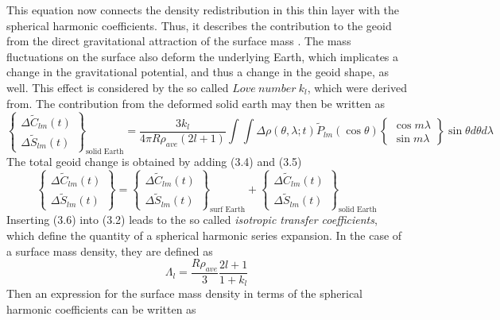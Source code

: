 This equation now connects the density redistribution in this thin layer with the spherical harmonic coefficients. Thus, it describes the contribution to the geoid from the direct gravitational attraction of the surface mass \cite{wahr1998time}. The mass fluctuations on the surface also deform the underlying Earth, which implicates a change in the gravitational potential, and thus a change in the geoid shape, as well. This effect is considered by the so called $Love\ number\ k_{l}$, which were derived from\cite{han1995viscoelastic}. The contribution from the deformed solid earth may then be written as
\begin{equation}
\begin{Bmatrix}
\Delta \tilde{C}_{lm}(t)\\
\Delta \tilde{S}_{lm}(t)
\end{Bmatrix}_{\text{solid Earth}} = \frac{3k_{l}}{4\pi R \rho_{ave}(2l+1)} \int \int \Delta \rho(\theta,\lambda;t) \tilde{P}_{lm}(\cos \theta) 
\begin{Bmatrix}
\cos m\lambda \\
\sin m\lambda
\end{Bmatrix} \sin\theta d\theta d\lambda
\end{equation}
The total geoid change is obtained by adding (3.4) and (3.5)
\begin{equation}
	\begin{Bmatrix}
	\Delta \tilde{C}_{lm}(t)\\
	\Delta \tilde{S}_{lm}(t)
	\end{Bmatrix} = \begin{Bmatrix}
	\Delta \tilde{C}_{lm}(t)\\
	\Delta \tilde{S}_{lm}(t)
	\end{Bmatrix}_{\text{surf Earth}} + \begin{Bmatrix}
	\Delta \tilde{C}_{lm}(t)\\
	\Delta \tilde{S}_{lm}(t)
	\end{Bmatrix}_{\text{solid Earth}}
\end{equation}
Inserting (3.6) into (3.2) leads to the so called \textit{isotropic transfer coefficients}, which define the quantity of a spherical harmonic series expansion. In the case of a surface mass density, they are defined as 
\begin{equation}
	\Lambda_{l} = \frac{R\rho_{ave}}{3} \frac{2l+1}{1+k_{l}}
\end{equation} 
Then an expression for the surface mass density in terms of the spherical harmonic coefficients can be written as
